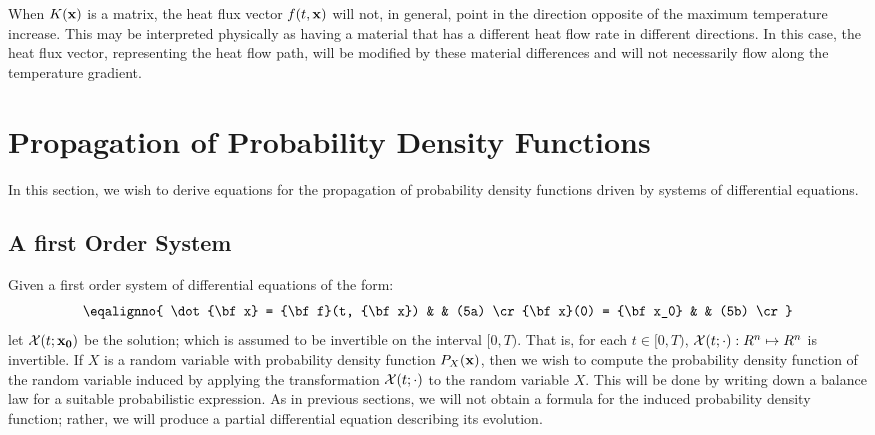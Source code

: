 When $K({\bf x})$ is a matrix, the heat flux vector $f(t,{\bf x})$ will not, 
in general, point in the direction opposite of the maximum 
temperature increase. This may be interpreted physically as having a material
that has a different heat flow rate in different directions. In this case,
the heat flux vector, representing the heat flow path, will be modified 
by these material differences and will not necessarily flow along 
the temperature gradient.


\section{Propagation of Probability Density Functions}
In this section, we wish to derive equations for the propagation of 
probability density functions driven by systems of differential equations.

\subsection{A first Order System}
Given a first order system of differential equations of the form:
$$
\eqalignno{
\dot {\bf x} =  {\bf f}(t, {\bf x}) & & (5a) \cr
{\bf x}(0) = {\bf x_0}  & & (5b) \cr }
$$
let ${\cal X}(t; {\bf x_0})$ be the solution; 
which is assumed to be invertible 
on the interval $[0,T)$.
That is, for each $t \in [0,T)$, ${\cal X}(t; \cdot): R^n \mapsto R^n$ 
is invertible. If $X$ is a random variable with 
probability density function $P_X({\bf x})$, then we wish to compute 
the probability density function of the random variable induced by 
applying the transformation 
${\cal X}(t; {\bf \cdot})$ to the random variable $X$.
This will be done by writing down a balance law for a 
suitable probabilistic expression. As in previous sections, we will not 
obtain a formula for the induced probability density function; rather, 
we will produce a partial differential equation describing its evolution.

